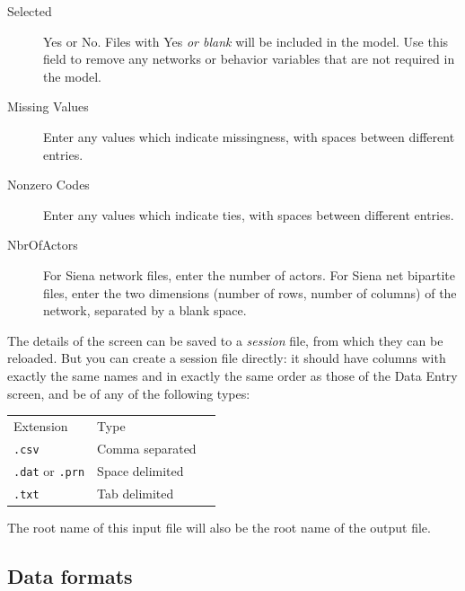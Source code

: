 \documentclass[a4paper,fleqn]{article}
\newcommand{\+}{\, + \,}
\newcommand{\sfn}[1]{\textsf{#1}}
\begin{document}
{\begin{description}
\item[\sfn{Selected}] Yes or No. Files with \sfn{Yes} \emph{or blank} will be
included in the model. Use this field to remove any networks or behavior
variables that are not required in the model.
\item[\sfn{Missing Values}] Enter any values which indicate missingness, with
  spaces between different entries.
\item[\sfn{Nonzero Codes}] Enter any values which indicate ties, with spaces
  between different entries.
\item[\sfn{NbrOfActors}] For \sfn{Siena network files}, enter the number of
  actors. For \sfn{Siena net bipartite files}, enter the two dimensions
  (number of rows, number of columns) of the network, separated by a blank space.
 \end{description}

 The details of the screen can be saved to a \emph{session} file, from which
 they can be reloaded. But you can create a session file directly: it should
 have columns with exactly the same names and in exactly the same order as those
 of the \sfn{Data Entry} screen, and be of any of the following types:
\begin{center}
\begin{tabular}{lll}\\
Extension&Type\\
\texttt{.csv}&Comma separated\\
\texttt{.dat} or \texttt{.prn}&Space delimited\\
\texttt{.txt}&Tab delimited\\
\end{tabular}
\end{center}

\noindent
The root name of this input file will also be the root name of the output file.

\bigskip

\subsection{Data formats}
\label{S_datform}

}
\end{document}
